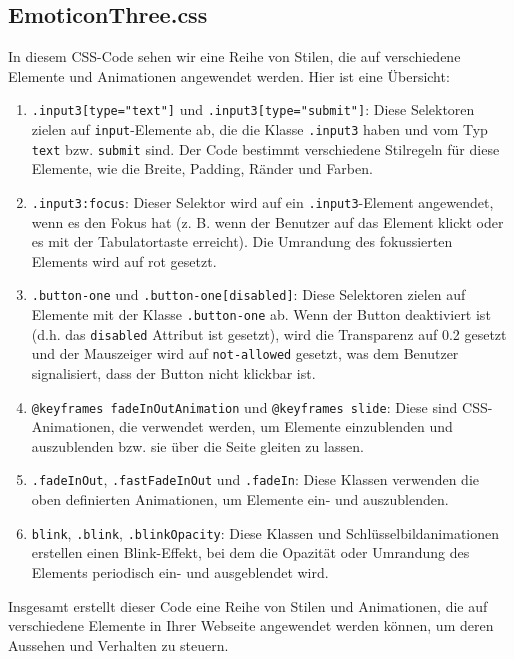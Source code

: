 \documentclass[./dokumentation.tex]{subfiles}
\begin{document}
\subsection{EmoticonThree.css}
In diesem CSS-Code sehen wir eine Reihe von Stilen, die auf verschiedene Elemente und Animationen angewendet werden. Hier ist eine Übersicht:\\
\begin{enumerate}
    \item \verb+.input3[type="text"]+ und \verb+.input3[type="submit"]+: Diese Selektoren zielen auf \verb+input+-Elemente ab, die die Klasse \verb+.input3+ haben und vom Typ \verb+text+ bzw. \verb+submit+ sind. Der Code bestimmt verschiedene Stilregeln für diese Elemente, wie die Breite, Padding, Ränder und Farben.\\
    \item \verb+.input3:focus+: Dieser Selektor wird auf ein \verb+.input3+-Element angewendet, wenn es den Fokus hat (z. B. wenn der Benutzer auf das Element klickt oder es mit der Tabulatortaste erreicht). Die Umrandung des fokussierten Elements wird auf rot gesetzt.\\
    \item \verb+.button-one+ und \verb+.button-one[disabled]+: Diese Selektoren zielen auf Elemente mit der Klasse \verb+.button-one+ ab. Wenn der Button deaktiviert ist (d.h. das \verb+disabled+ Attribut ist gesetzt), wird die Transparenz auf 0.2 gesetzt und der Mauszeiger wird auf \verb+not-allowed+ gesetzt, was dem Benutzer signalisiert, dass der Button nicht klickbar ist.\\
    \item \verb+@keyframes fadeInOutAnimation+ und \verb+@keyframes slide+: Diese sind CSS-Animationen, die verwendet werden, um Elemente einzublenden und auszublenden bzw. sie über die Seite gleiten zu lassen.\\
    \item \verb+.fadeInOut+, \verb+.fastFadeInOut+ und \verb+.fadeIn+: Diese Klassen verwenden die oben definierten Animationen, um Elemente ein- und auszublenden.\\
    \item \verb+blink+, \verb+.blink+, \verb+.blinkOpacity+: Diese Klassen und Schlüsselbildanimationen erstellen einen Blink-Effekt, bei dem die Opazität oder Umrandung des Elements periodisch ein- und ausgeblendet wird.\\
\end{enumerate}
Insgesamt erstellt dieser Code eine Reihe von Stilen und Animationen, die auf verschiedene Elemente in Ihrer Webseite angewendet werden können, um deren Aussehen und Verhalten zu steuern.
\end{document}
